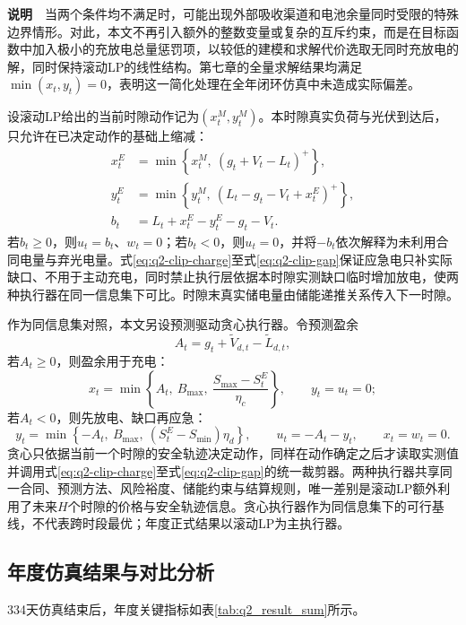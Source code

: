 \noindent\textbf{说明}　当两个条件均不满足时，可能出现外部吸收渠道和电池余量同时受限的特殊边界情形。对此，本文不再引入额外的整数变量或复杂的互斥约束，而是在目标函数中加入极小的充放电总量惩罚项，以较低的建模和求解代价选取无同时充放电的解，同时保持滚动LP的线性结构。第七章的全量求解结果均满足$\min(x_t,y_t)=0$，表明这一简化处理在全年闭环仿真中未造成实际偏差。

设滚动LP给出的当前时隙动作记为$(x_t^M,y_t^M)$。本时隙真实负荷与光伏到达后，只允许在已决定动作的基础上缩减：
\begin{align}
x_t^E&=\min\left\{x_t^M,\ \left(g_t+V_t-L_t\right)^+\right\}, \label{eq:q2-clip-charge}\\
y_t^E&=\min\left\{y_t^M,\ \left(L_t-g_t-V_t+x_t^E\right)^+\right\}, \label{eq:q2-clip-discharge}\\
b_t&=L_t+x_t^E-y_t^E-g_t-V_t. \label{eq:q2-clip-gap}
\end{align}
若$b_t\ge0$，则$u_t=b_t$、$w_t=0$；若$b_t<0$，则$u_t=0$，并将$-b_t$依次解释为未利用合同电量与弃光电量。式\eqref{eq:q2-clip-charge}至式\eqref{eq:q2-clip-gap}保证应急电只补实际缺口、不用于主动充电，同时禁止执行层依据本时隙实测缺口临时增加放电，使两种执行器在同一信息集下可比。时隙末真实储电量由储能递推关系传入下一时隙。

作为同信息集对照，本文另设预测驱动贪心执行器。令预测盈余
\[
A_t=g_t+\widetilde V_{d,t}-\widetilde L_{d,t},
\]
若$A_t\ge0$，则盈余用于充电：
\[
x_t=\min\left\{A_t,\ B_{\max},\ \frac{S_{\max}-S_t^E}{\eta_c}\right\},\qquad y_t=u_t=0;
\]
若$A_t<0$，则先放电、缺口再应急：
\[
y_t=\min\left\{-A_t,\ B_{\max},\ \left(S_t^E-S_{\min}\right)\eta_d\right\},\qquad u_t=-A_t-y_t,\qquad x_t=w_t=0.
\]
贪心只依据当前一个时隙的安全轨迹决定动作，同样在动作确定之后才读取实测值并调用式\eqref{eq:q2-clip-charge}至式\eqref{eq:q2-clip-gap}的统一裁剪器。两种执行器共享同一合同、预测方法、风险裕度、储能约束与结算规则，唯一差别是滚动LP额外利用了未来$H$个时隙的价格与安全轨迹信息。贪心执行器作为同信息集下的可行基线，不代表跨时段最优；年度正式结果以滚动LP为主执行器。

\subsection{年度仿真结果与对比分析}\label{subsec:q2-result}
334天仿真结束后，年度关键指标如表\ref{tab:q2_result_sum}所示。

